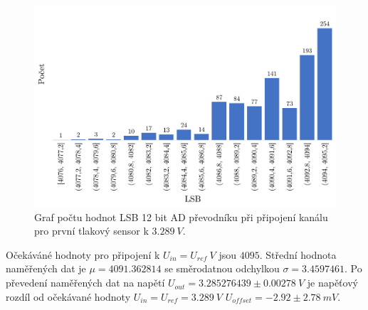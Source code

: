 \begin{figure}[H]
    \caption{Graf počtu hodnot LSB 12 bit AD převodníku při připojení kanálu pro první tlakový sensor k $3.289 \ V$.}
    \label{fig:hist_vacuum1_3_3}
    \includegraphics[width=1\textwidth]{graphs/vacuum1_33.png}

\end{figure}

Očekáváné hodnoty pro připojení k $U_{in} = U_{ref} \ V$ jsou $4095$. Střední hodnota naměřených dat je $\mu = 4091.362814$ se směrodatnou odchylkou $\sigma = 3.4597461$. Po převedení naměřených dat na napětí $U_{out} = 3.285276439 \pm 0.00278 \ V$ je napěťový rozdíl od očekávané hodnoty $U_{in} = U_{ref} = 3.289 \ V$
$U_{offset} = -2.92 \pm 2.78 \ mV$.



